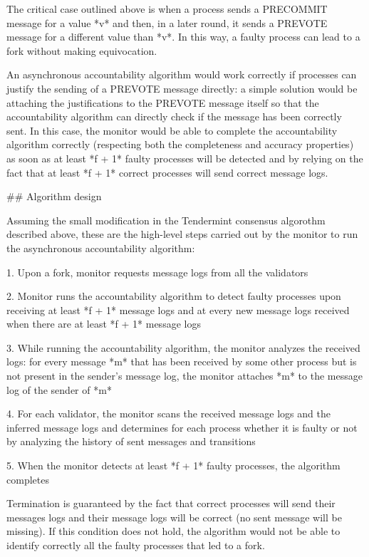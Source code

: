 \documentclass[a4paper,11pt,oneside]{report}
\begin{document}
\begin{markdown}
The critical case outlined above is when a process sends a PRECOMMIT message for a value *v* and then, in a later round, it sends a PREVOTE message for a different value than *v*. In this way, a faulty process can lead to a fork without making equivocation.

An asynchronous accountability algorithm would work correctly if processes can justify the sending of a PREVOTE message directly: a simple solution would be attaching the justifications to the PREVOTE message itself so that the accountability algorithm can directly check if the message has been correctly sent.
In this case, the monitor would be able to complete the accountability algorithm correctly (respecting both the completeness and accuracy properties) as soon as at least *f + 1* faulty processes will be detected and by relying on the fact that at least *f + 1* correct processes will send correct message logs.

## Algorithm design
 
Assuming the small modification in the Tendermint consensus algorothm described above, these are the high-level steps carried out by the monitor to run the asynchronous accountability algorithm:

1. Upon a fork, monitor requests message logs from all the validators

2. Monitor runs the accountability algorithm to detect faulty processes upon receiving at least *f + 1* message logs and at every new message logs received when there are at least *f + 1* message logs 

3. While running the accountability algorithm, the monitor analyzes the received logs: for every message *m* that has been received by some other process but is not present in the sender's message log, the monitor attaches *m* to the message log of the sender of *m*

4. For each validator, the monitor scans the received message logs and the inferred message logs and determines for each process whether it is faulty or not by analyzing the history of sent messages and transitions

5. When the monitor detects at least *f + 1* faulty processes, the algorithm completes

Termination is guaranteed by the fact that correct processes will send their messages logs and their message logs will be correct (no sent message will be missing). 
If this condition does not hold, the algorithm would not be able to identify correctly all the faulty processes that led to a fork. 


\end{markdown}
\end{document}
